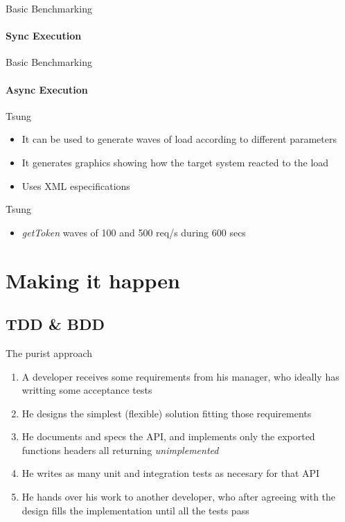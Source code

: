 \documentclass[aspectratio=169]{beamer}
\begin{document}
\begin{frame}{Basic Benchmarking}
    \framesubtitle{Sync Execution}
    
\end{frame}

\begin{frame}{Basic Benchmarking}
    \framesubtitle{Async Execution}
    
\end{frame}

\begin{frame}{Tsung}
    \begin{itemize}
    \item It can be used to generate waves of load according to different parameters
    \item It generates graphics showing how the target system reacted to the load
    \item Uses XML especifications
    \end{itemize}
\end{frame}

\begin{frame}{Tsung}
    \begin{itemize}
    \item \emph{getToken} waves of 100 and 500 req/s during 600 secs
    
    \end{itemize}
\end{frame}

\section{Making it happen}
\label{making_it_happen}

\subsection*{TDD \& BDD}
\label{tdd}

\begin{frame}{The purist approach}
    \begin{enumerate}
    \item A developer receives some requirements from his manager, who ideally has writting some acceptance tests
    \pause
    \item He designs the simplest (flexible) solution fitting those requirements
    \pause
    \item He documents and specs the API, and implements only the exported functions headers all returning \emph{unimplemented}
    \pause
    \item He writes as many unit and integration tests as necesary for that API
    \pause
    \item He hands over his work to another developer, who after agreeing with the design fills the implementation until
    all the tests pass
    \end{enumerate}
\end{frame}
\end{document}
